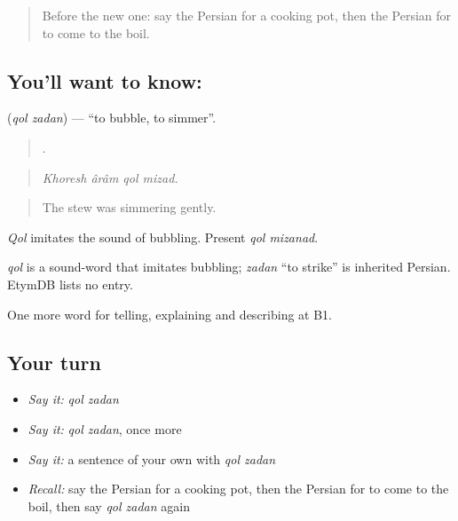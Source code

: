 \label{lesson:FA-C358-qol-zadan}



\begin{quote}
Before the new one: say the Persian for a cooking pot, then the Persian for to come to the boil.
\end{quote}

\subsection*{You'll want to know:  }
\textbf{ } (\emph{qol zadan}) — \textquotedblleft{}to bubble, to simmer\textquotedblright{}.

\begin{quote}
   .
\end{quote}

\begin{quote}
\emph{Khoresh ârâm qol mizad.}
\end{quote}

\begin{quote}
The stew was simmering gently.
\end{quote}

\emph{Qol} imitates the sound of bubbling. Present \emph{qol mizanad}.

\begin{cousinweb}
\emph{qol} is a sound-word that imitates bubbling; \emph{zadan} \textquotedblleft{}to strike\textquotedblright{} is inherited Persian. EtymDB lists no entry.
\end{cousinweb}

\begin{grammarlens}[title={What you've built}]
One more word for telling, explaining and describing at B1.
\end{grammarlens}

\subsection*{Your turn}
\begin{itemize}
\raggedright
  \item \emph{Say it:} \emph{qol zadan}
  \item \emph{Say it:} \emph{qol zadan}, once more
  \item \emph{Say it:} a sentence of your own with \emph{qol zadan}
  \item \emph{Recall:} say the Persian for a cooking pot, then the Persian for to come to the boil, then say \emph{qol zadan} again
\end{itemize}

